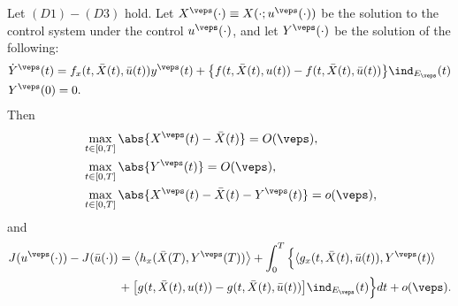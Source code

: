 \begin{lemma}
Let $(D1)-(D3)$ hold. Let $X^{\veps}(\cdot) \equiv X(\cdot; u^{\veps}(\cdot))$
be the solution to the control system under the control $u^{\veps}(\cdot)$,
and let $Y^{\veps}(\cdot)$ be the solution of the following:
    \begin{equation}\label{Lem;EqY}
        \begin{aligned}
            &\Dot{Y}^{\veps}(t) = f_{x}(t, \Bar{X}(t), \Bar{u}(t))y^{\veps}(t) %
                + \big\{ f(t, \Bar{X}(t), u(t)) - f(t, \Bar{X}(t), \Bar{u}(t))\big\}
                \ind_{E_{\veps}}(t) \\
            &Y^{\veps}(0) = 0.          
        \end{aligned}
    \end{equation}
    Then
    \begin{align}
        &\max_{t \in [0,T]}\abs{X^{\veps}(t) - \Bar{X}(t)} = O(\veps), \label{Lem;eq1} \\
        &\max_{t\in[0,T]}\abs{Y^{\veps}(t)} = O(\veps), \label{Lem;eq2}\\
        &\max_{t \in [0,T]}\abs{X^{\veps}(t) - \Bar{X}(t) - Y^{\veps}(t)} = o(\veps),\label{Lem;eq3}
    \end{align}
    and
    \begin{equation}\label{Lem;eq4}
        \begin{aligned}
            J(u^{\veps}(\cdot)) - J(\Bar{u}(\cdot)) 
            &= \big\langle h_{x} (\Bar{X}(T), Y^{\veps}(T)) \big\rangle + \int_{0}^{T} %
                \Big\{ \langle g_x(t, \Bar{X}(t), \Bar{u}(t)), Y^{\veps}(t)\rangle \\
            &+ \big[g(t, \Bar{X}(t), u(t)) - g(t, \Bar{X}(t), \Bar{u}(t))\big] %
                \ind_{E_{\veps}}(t) \Big\}dt + o(\veps).
        \end{aligned}
    \end{equation}
\end{lemma}
